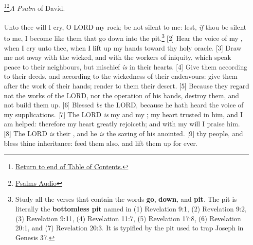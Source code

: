\footnote{\textcolor[cmyk]{0.99998,1,0,0}{\hyperlink{TOC}{Return to end of Table of Contents.}}}\footnote{\href{https://www.audioverse.org/english/audiobibles/books/ENGKJV/O/Ps/1}{\textcolor[cmyk]{0.99998,1,0,0}{Psalms Audio}}}\textcolor[cmyk]{0.99998,1,0,0}{\emph{A Psalm} of David.}\\
\\
\textcolor[cmyk]{0.99998,1,0,0}{Unto thee will I cry, O LORD my rock; be not silent to me: lest, \emph{if} thou be silent to me, I become like them that go down into the pit.}\footnote{Study all the verses that contain the words \textbf{go}, \textbf{down}, and \textbf{pit}. The pit is literally the \textbf{bottomless pit} named in (1) Revelation 9:1, (2) Revelation 9:2, (3) Revelation 9:11, (4) Revelation 11:7, (5) Revelation 17:8, (6) Revelation 20:1, and (7) Revelation 20:3. It  is typified by the pit used to trap Joseph in Genesis 37.}
[2] \textcolor[cmyk]{0.99998,1,0,0}{Hear the voice of my , when I cry unto thee, when I lift up my hands toward thy holy oracle.}
[3] \textcolor[cmyk]{0.99998,1,0,0}{Draw me not away with the wicked, and with the workers of iniquity, which speak peace to their neighbours, but mischief \emph{is} in their hearts.}
[4] \textcolor[cmyk]{0.99998,1,0,0}{Give them according to their deeds, and according to the wickedness of their endeavours: give them after the work of their hands; render to them their desert.}
[5] \textcolor[cmyk]{0.99998,1,0,0}{Because they regard not the works of the LORD, nor the operation of his hands,  destroy them, and not build them up.}
[6] \textcolor[cmyk]{0.99998,1,0,0}{Blessed \emph{be} the LORD, because he hath heard the voice of my supplications.}
[7] \textcolor[cmyk]{0.99998,1,0,0}{The LORD \emph{is} my  and my ; my heart trusted in him, and I am helped: therefore my heart greatly rejoiceth; and with my  will I praise him.}
[8] \textcolor[cmyk]{0.99998,1,0,0}{The LORD \emph{is} their , and he \emph{is} the saving  of his anointed.}
[9] \textcolor[cmyk]{0.99998,1,0,0}{ thy people, and bless thine inheritance: feed them also, and lift them up for ever.}



